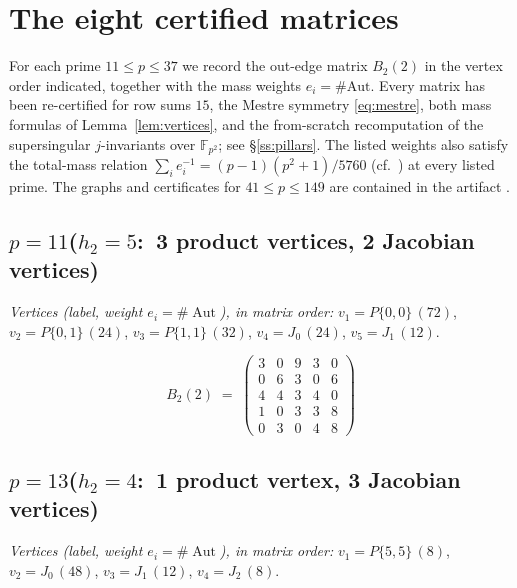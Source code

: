 \documentclass[11pt]{amsart}
\theoremstyle{plain}
\theoremstyle{definition}
\newcommand{\F}{\mathbb{F}}
\newcommand{\Aut}{\mathrm{Aut}}
\begin{document}
	\appendix
	
	\section{The eight certified matrices}\label{app:matrices}
	For each prime $11\le p\le37$ we record the out-edge matrix $B_2(2)$ in the
	vertex order indicated, together with the mass weights $e_i=\#\Aut$. Every
	matrix has been re-certified for row sums $15$, the Mestre symmetry
	\eqref{eq:mestre}, both mass formulas of Lemma~\ref{lem:vertices}, and the
	from-scratch recomputation of the supersingular $j$-invariants over $\F_{p^2}$;
	see \S\ref{ss:pillars}. The listed weights also satisfy the total-mass
	relation $\sum_i e_i^{-1}=(p-1)(p^2+1)/5760$ (cf.\ \cite{HashimotoIbukiyama})
	at every listed prime. The graphs and certificates for $41\le p\le149$
	are contained in the artifact \cite{artifact}.
	
	\subsection*{\texorpdfstring{$p=11$\quad ($h_2=5$:\ 3 product vertices, 2 Jacobian vertices)}{p=11 (h2=5: 3 product vertices, 2 Jacobian vertices)}}
	\begin{sloppypar}\noindent\small\textit{Vertices (label, weight $e_i=\#\operatorname{Aut}$), in matrix order:} $v_{1}{=}P\{0,0\}\,(72)$, $v_{2}{=}P\{0,1\}\,(24)$, $v_{3}{=}P\{1,1\}\,(32)$, $v_{4}{=}J_{0}\,(24)$, $v_{5}{=}J_{1}\,(12)$.\end{sloppypar}
	
	\begingroup\small\setlength{\arraycolsep}{4pt}
	\[ B_2(2)\;=\;\left(\begin{array}{*{5}{r}}
		3 & 0 & 9 & 3 & 0 \\
		0 & 6 & 3 & 0 & 6 \\
		4 & 4 & 3 & 4 & 0 \\
		1 & 0 & 3 & 3 & 8 \\
		0 & 3 & 0 & 4 & 8
	\end{array}\right) \]
	\endgroup
	
	\subsection*{\texorpdfstring{$p=13$\quad ($h_2=4$:\ 1 product vertex, 3 Jacobian vertices)}{p=13 (h2=4: 1 product vertex, 3 Jacobian vertices)}}
	\begin{sloppypar}\noindent\small\textit{Vertices (label, weight $e_i=\#\operatorname{Aut}$), in matrix order:} $v_{1}{=}P\{5,5\}\,(8)$, $v_{2}{=}J_{0}\,(48)$, $v_{3}{=}J_{1}\,(12)$, $v_{4}{=}J_{2}\,(8)$.\end{sloppypar}
	
\end{document}
